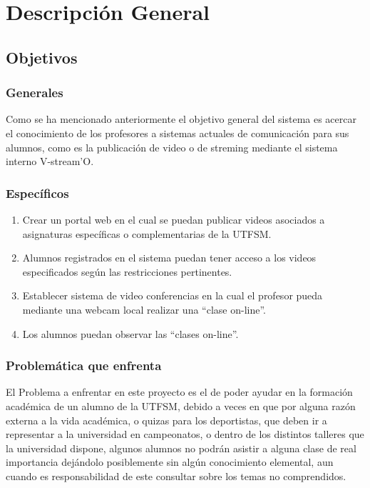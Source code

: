 \documentclass[12pt]{article}
\begin{document}
\newpage
\section{Descripción General}

\subsection{Objetivos}
\subsubsection{Generales}
Como se ha mencionado anteriormente el objetivo general del sistema es acercar el conocimiento de los 
profesores a sistemas actuales de comunicación para sus alumnos, como es la publicación de video o de streming
mediante el sistema interno V-stream'O.
\subsubsection{Específicos}
\begin{enumerate}
\item Crear un portal web en el cual se puedan publicar videos asociados a asignaturas específicas o 
complementarias de la UTFSM.
\item Alumnos registrados en el sistema puedan tener acceso a los videos especificados según las
restricciones pertinentes.
\item Establecer sistema de video conferencias en la cual el profesor pueda mediante una webcam local
realizar una ``clase on-line''.
\item Los alumnos puedan observar las ``clases on-line''.%
\end{enumerate}

\subsubsection{Problemática que enfrenta}
El Problema a enfrentar en este proyecto es el de poder ayudar en la formación académica de un alumno de la 
UTFSM, debido a veces en que por alguna razón externa a la vida académica, o quizas para los
deportistas, que deben ir a representar a la universidad en campeonatos, o dentro de los distintos talleres 
que la universidad dispone, algunos alumnos no podrán
asistir a alguna clase de real importancia dejándolo posiblemente sin algún conocimiento elemental, aun
cuando es responsabilidad de este consultar sobre los temas no comprendidos.
\end{document}
